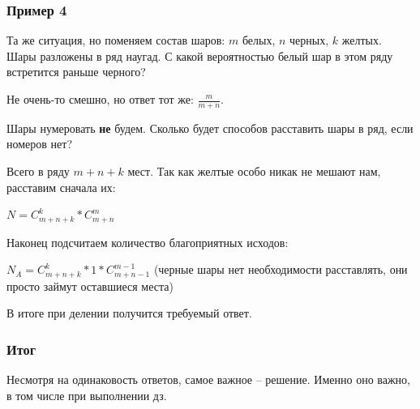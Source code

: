 \documentclass{article}
\begin{document}
\subsubsection{Пример 4}

Та же ситуация, но поменяем состав шаров: $m$ белых, $n$ черных, $k$ желтых. Шары разложены в ряд наугад. С какой вероятностью белый шар в этом ряду встретится раньше черного?

Не очень-то смешно, но ответ тот же: $\frac{m}{m + n}$.

Шары нумеровать \textbf{не} будем. Сколько будет способов расставить шары в ряд, если номеров нет?

Всего в ряду $m + n + k$ мест. Так как желтые особо никак не мешают нам, расставим сначала их:

$N = C_{m + n + k}^k * C_{m + n}^m$

Наконец подсчитаем количество благоприятных исходов:

$N_A = C_{m + n + k}^k * 1 * C_{m + n - 1}^{m - 1}$ (черные шары нет необходимости расставлять, они просто займут оставшиеся места)

В итоге при делении получится требуемый ответ.

\subsubsection{Итог}

Несмотря на одинаковость ответов, самое важное -- решение. Именно оно важно, в том числе при выполнении дз.
\end{document}
